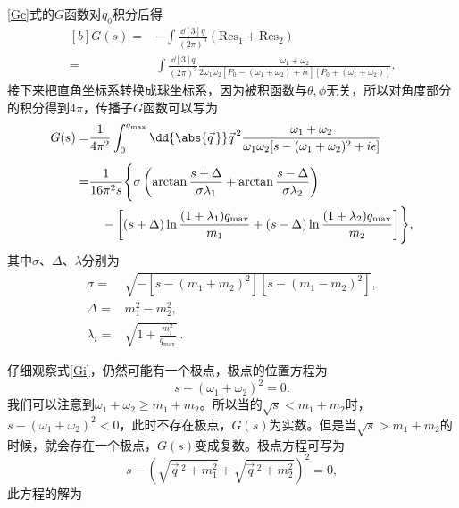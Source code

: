 \eqref{Gc}式的$G$函数对$q_{0}$积分后得
\begin{equation}
	\begin{aligned}[b]
		G(s)=&-\int\frac{\dd[3]{q}}{(2\pi)^{3}}(\text{Res}_{1}+\text{Res}_{2})\\[1ex]
	=&\int\frac{\dd[3]{q}}{(2\pi)^{3}}\frac{\omega_{1}+\omega_{2}}{2\omega_{1}\omega_{2}[P_{0}-(\omega_{1}+\omega_{2})+i\epsilon][P_{0}+(\omega_{1}+\omega_{2})]}.
	\end{aligned}
\end{equation}
接下来把直角坐标系转换成球坐标系，因为被积函数与$\theta,\phi$无关，所以对角度部分的积分得到$4\pi$，传播子$G$函数可以写为
\begin{equation}
\label{Gi}
\begin{split}
	G(s)=&\frac{1}{4\pi^2}\int^{q_{\text{max}}}_{0}\dd{\abs{\vec{q\,}}}\vec{q\,}^2\frac{\omega_{1}+\omega_{2}}{\omega_{1}\omega_{2}[s-(\omega_{1}+\omega_{2})^2+i\epsilon]}\\[1ex]
	=&\frac{1}{16\pi^2s}\Biggl\{\sigma\left(\arctan\frac{s+\Delta}{\sigma\lambda_{1}}+\arctan\frac{s-\Delta}{\sigma\lambda_{2}}\right)\\
	 &\quad-\left[(s+\Delta)\ln\frac{(1+\lambda_{1})q_{\text{max}}}{m_{1}}+(s-\Delta)\ln\frac{(1+\lambda_{2})q_{\text{max}}}{m_{2}}\right]\Biggr\},
\end{split}
\end{equation}
其中$\sigma$、$\Delta$、$\lambda$分别为
\begin{equation}
\begin{split}
	\sigma=&\sqrt{-[s-(m_{1}+m_{2})^2][s-(m_{1}-m_{2})^2]},\\[1ex]
	\Delta=&m_{1}^2-m_{2}^2,\\[1ex]
	\lambda_{i}=&\sqrt{1+\frac{m_{i}^2}{q_{\text{max}}}}\ .
\end{split}
\end{equation}
\par
仔细观察式\eqref{Gi}，仍然可能有一个极点，极点的位置方程为
\begin{equation}
	s-(\omega_{1}+\omega_{2})^2=0.
\end{equation}
我们可以注意到$\omega_{1}+\omega_{2}\ge m_{1}+m_{2}$。所以当的$\sqrt{s}< m_{1}+m_{2}$时，$s-(\omega_{1}+\omega_{2})^2<0$，此时不存在极点，$G(s)$为实数。但是当$\sqrt{s}>m_{1}+m_{2}$的时候，就会存在一个极点，$G(s)$变成复数。极点方程可写为
\begin{equation}
	s-\left(\sqrt{\vec{q}\,^2+m_{1}^2}+\sqrt{\vec{q}\,^2+m_{2}^2}\right)^2=0,
\end{equation}
此方程的解为
